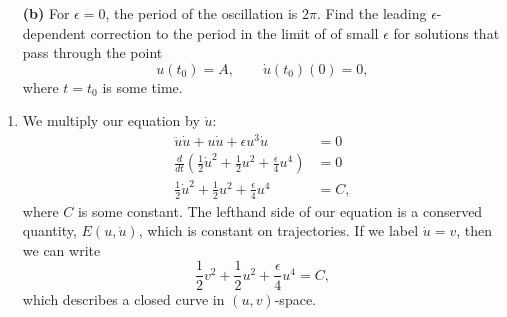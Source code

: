 \documentclass[10pt,letterpaper]{report}
\begin{document}
\begin{enumerate}
\begin{qbox}
\begin{itemize}
    \item[\textbf{(b)}] For $\epsilon = 0$, the period of the oscillation is $2\pi$. Find the leading $\epsilon$-dependent correction to the period in the limit of of small $\epsilon$ for solutions that pass through the point 
    \[
    u(t_0) = A, \qquad \dot u(t_0)(0) = 0,
    \] 
    where $t = t_0$ is some time.
\end{itemize}
\end{qbox}
\begin{enumerate}
    \item We multiply our equation by $\dot u$:
    \begin{align*}
        \ddot u \dot u + u\dot u + \epsilon u^3\dot u &= 0
        \\
        \frac{d}{dt}\left(\frac{1}{2}\dot u^2 + \frac{1}{2}u^2 + \frac{\epsilon}{4}u^4\right) &= 0
        \\
        \frac{1}{2}\dot u^2 + \frac{1}{2}u^2 + \frac{\epsilon}{4}u^4 &= C,
    \end{align*}
    where $C$ is some constant. The lefthand side of our equation is a conserved quantity, $E(u, \dot u)$, which is constant on trajectories. If we label $\dot u = v$, then we can write
    \[
    \frac{1}{2}v^2 + \frac{1}{2}u^2 + \frac{\epsilon}{4}u^4 = C,
    \]
    which describes a closed curve in $(u, v)$-space.
    

\end{enumerate}
\end{enumerate}
\end{document}
